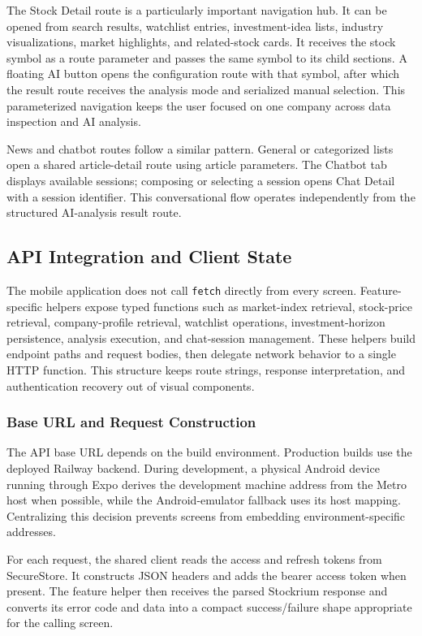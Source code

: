 The Stock Detail route is a particularly important navigation hub. It can be opened from search results, watchlist entries, investment-idea lists, industry visualizations, market highlights, and related-stock cards. It receives the stock symbol as a route parameter and passes the same symbol to its child sections. A floating AI button opens the configuration route with that symbol, after which the result route receives the analysis mode and serialized manual selection. This parameterized navigation keeps the user focused on one company across data inspection and AI analysis.

News and chatbot routes follow a similar pattern. General or categorized lists open a shared article-detail route using article parameters. The Chatbot tab displays available sessions; composing or selecting a session opens Chat Detail with a session identifier. This conversational flow operates independently from the structured AI-analysis result route.

\subsection{API Integration and Client State}
\label{subsec:api-integration-client-state}

The mobile application does not call \texttt{fetch} directly from every screen. Feature-specific helpers expose typed functions such as market-index retrieval, stock-price retrieval, company-profile retrieval, watchlist operations, investment-horizon persistence, analysis execution, and chat-session management. These helpers build endpoint paths and request bodies, then delegate network behavior to a single HTTP function. This structure keeps route strings, response interpretation, and authentication recovery out of visual components.

\subsubsection{Base URL and Request Construction}

The API base URL depends on the build environment. Production builds use the deployed Railway backend. During development, a physical Android device running through Expo derives the development machine address from the Metro host when possible, while the Android-emulator fallback uses its host mapping. Centralizing this decision prevents screens from embedding environment-specific addresses.

For each request, the shared client reads the access and refresh tokens from SecureStore. It constructs JSON headers and adds the bearer access token when present. The feature helper then receives the parsed Stockrium response and converts its error code and data into a compact success/failure shape appropriate for the calling screen.

